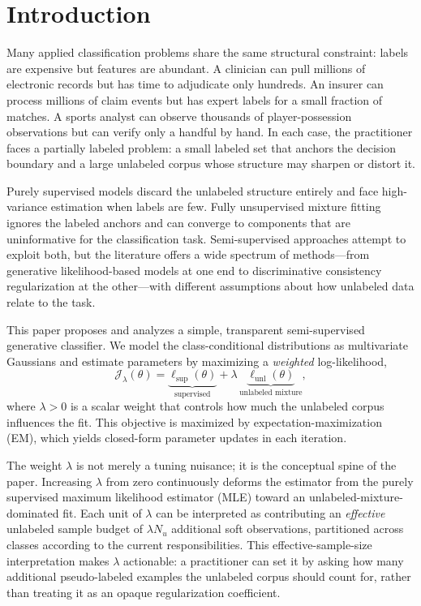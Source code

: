 \documentclass[11pt]{article}
\theoremstyle{definition}
\newcommand{\calJ}{\mathcal{J}}
\newcommand{\lam}{\lambda}
\begin{document}
\section{Introduction}
\label{sec:intro}

Many applied classification problems share the same structural constraint:
labels are expensive but features are abundant.
A clinician can pull millions of electronic records but has time to adjudicate
only hundreds.
An insurer can process millions of claim events but has expert labels for a
small fraction of matches.
A sports analyst can observe thousands of player-possession observations
but can verify only a handful by hand.
In each case, the practitioner faces a partially labeled problem: a small
labeled set that anchors the decision boundary and a large unlabeled corpus
whose structure may sharpen or distort it.

Purely supervised models discard the unlabeled structure entirely and face
high-variance estimation when labels are few.
Fully unsupervised mixture fitting ignores the labeled anchors and can converge
to components that are uninformative for the classification task.
Semi-supervised approaches attempt to exploit both, but the literature offers
a wide spectrum of methods---from generative likelihood-based models at one
end to discriminative consistency regularization at the other---with different
assumptions about how unlabeled data relate to the task.

This paper proposes and analyzes a simple, transparent semi-supervised
generative classifier.
We model the class-conditional distributions as multivariate Gaussians and
estimate parameters by maximizing a \emph{weighted} log-likelihood,
\begin{equation}
\calJ_\lam(\theta)
= \underbrace{\ell_{\mathrm{sup}}(\theta)}_{\text{supervised}}
+ \lam\,\underbrace{\ell_{\mathrm{unl}}(\theta)}_{\text{unlabeled mixture}},
\label{eq:intro-objective}
\end{equation}
where \(\lam>0\) is a scalar weight that controls how much the unlabeled
corpus influences the fit.
This objective is maximized by expectation-maximization (EM), which yields
closed-form parameter updates in each iteration.

The weight \(\lam\) is not merely a tuning nuisance; it is the conceptual
spine of the paper.
Increasing \(\lam\) from zero continuously deforms the estimator from the
purely supervised maximum likelihood estimator (MLE) toward an unlabeled-mixture-dominated fit.
Each unit of \(\lam\) can be interpreted as contributing an
\emph{effective} unlabeled sample budget of \(\lam N_u\) additional soft
observations, partitioned across classes according to the current
responsibilities.
This effective-sample-size interpretation makes \(\lam\) actionable:
a practitioner can set it by asking how many additional pseudo-labeled
examples the unlabeled corpus should count for, rather than treating it
as an opaque regularization coefficient.
\end{document}
